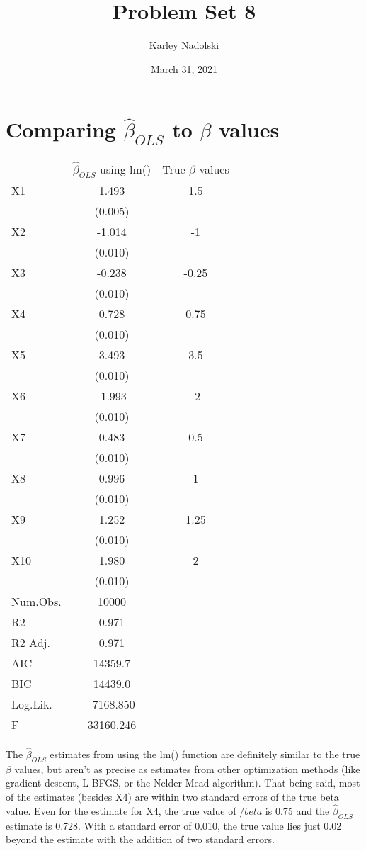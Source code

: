 \documentclass{article}
\title{Problem Set 8}
\author{Karley Nadolski}
\date{March 31, 2021}
\begin{document}
\maketitle
\section{Comparing $\hat{\beta}_{OLS}$ to $\beta$ values}
\begin{table} [h]
\centering
\begin{tabular}[t]{lcc}
  & $\hat{\beta}_{OLS}$ using lm() & True $\beta$ values\\
X1 & 1.493 & 1.5\\
 & (0.005)\\
X2 & -1.014 & -1\\
 & \vphantom{8} (0.010)\\
X3 & -0.238 & -0.25\\
 & \vphantom{7} (0.010)\\
X4 & 0.728 & 0.75\\
 & \vphantom{6} (0.010)\\
X5 & 3.493 & 3.5\\
 & \vphantom{5} (0.010)\\
X6 & -1.993 & -2\\
 & \vphantom{4} (0.010)\\
X7 & 0.483 & 0.5\\
 & \vphantom{3} (0.010)\\
X8 & 0.996 & 1\\
 & \vphantom{2} (0.010)\\
X9 & 1.252 & 1.25\\
 & \vphantom{1} (0.010)\\
X10 & 1.980 & 2\\
 & (0.010)\\
Num.Obs. & 10000\\
R2 & 0.971\\
R2 Adj. & 0.971\\
AIC & 14359.7\\
BIC & 14439.0\\
Log.Lik. & -7168.850\\
F & 33160.246\\
\end{tabular}
\end{table}

The $\hat{\beta}_{OLS}$ estimates from using the lm() function are definitely similar to the true $\beta$ values, but aren't as precise as estimates from other optimization methods (like gradient descent, L-BFGS, or the Nelder-Mead algorithm). That being said, most of the estimates (besides X4) are within two standard errors of the true beta value. Even for the estimate for X4, the true value of $/beta$ is 0.75 and the $\hat{\beta}_{OLS}$ estimate is 0.728. With a standard error of 0.010, the true value lies just 0.02 beyond the estimate with the addition of two standard errors. 
\end{document}
